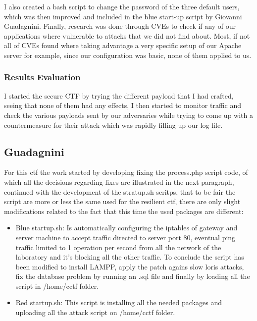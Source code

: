 \documentclass[14pt]{article}
\begin{document}
I also created a bash script to change the password of the three default users, which was then improved and included in the blue start-up script by Giovanni Guadagnini.
Finally, research was done through CVEs to check if any of our applications where vulnerable to attacks that we did not find about. Most, if not all of CVEs found where taking advantage a very specific setup of our Apache server for example, since our configuration was basic, none of them applied to us.


\subsubsection{Results Evaluation}
I started the secure CTF by trying the different payload that I had crafted, seeing that none of them had any effects, I then started to monitor traffic and check the various payloads sent by our adversaries while trying to come up with a countermeasure for their attack which was rapidly filling up our log file. 

\subsection{Guadagnini}
For this ctf the work started by developing fixing the process.php script code, of which all the decisions regarding fixes are illustrated in the next paragraph, continued with the development of the stratup.sh scritps, that to be fair the script are more or less the same used for the resilient ctf, there are only slight modifications related to the fact that this time the used packages are different:
\begin{itemize}
	\item Blue startup.sh: Is automatically configuring the iptables of gateway and server machine to accept traffic directed to server port 80, eventual ping traffic limited to 1 operation per second from all the network of the laboratory and it's blocking all the other traffic. To conclude the script has been modified to install LAMPP, apply the patch agains slow loris attacks, fix the database problem by running an .sql file and finally by loading all the script in /home/cctf folder.
	
	\item Red startup.sh: This script is installing all the needed packages and uploading all the attack script on /home/cctf folder.
\end{itemize} 
\end{document}
